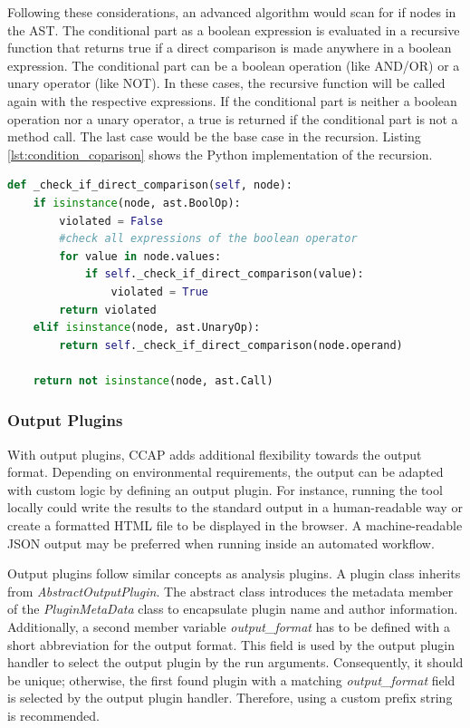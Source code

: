 Following these considerations, an advanced algorithm would scan for if nodes in the AST. The conditional part as a boolean expression is evaluated in a recursive function that returns true if a direct comparison is made anywhere in a boolean expression.
The conditional part can be a boolean operation (like AND/OR) or a unary operator (like NOT).  In these cases, the recursive function will be called again with the respective expressions. If the conditional part is neither a boolean operation nor a unary operator, a true is returned if the conditional part is not a method call. The last case would be the base case in the recursion. Listing \ref{lst:condition_coparison} shows the Python implementation of the recursion.
\begin{lstlisting}[language=Python, label=lst:condition_coparison, caption={Recursive function to analyse an if statement for direct comparisons. Since a condition should contain a method call, the function returns False if this is not the case.}]
def _check_if_direct_comparison(self, node):
    if isinstance(node, ast.BoolOp):
        violated = False
        #check all expressions of the boolean operator
        for value in node.values:
            if self._check_if_direct_comparison(value):
                violated = True
        return violated
    elif isinstance(node, ast.UnaryOp):
        return self._check_if_direct_comparison(node.operand)

    return not isinstance(node, ast.Call)\end{lstlisting}

\subsubsection{Output Plugins}
With output plugins, CCAP adds additional flexibility towards the output format. Depending on environmental requirements, the output can be adapted with custom logic by defining an output plugin. For instance, running the tool locally could write the results to the standard output in a human-readable way or create a formatted HTML file to be displayed in the browser. A machine-readable JSON output may be preferred when running inside an automated workflow.

Output plugins follow similar concepts as analysis plugins. A plugin class inherits from \textit{AbstractOutputPlugin}. The abstract class introduces the metadata member of the \textit{PluginMetaData} class to encapsulate plugin name and author information. Additionally, a second member variable \textit{output\_format} has to be defined with a short abbreviation for the output format. This field is used by the output plugin handler to select the output plugin by the run arguments. Consequently, it should be unique; otherwise, the first found plugin with a matching \textit{output\_format} field is selected by the output plugin handler. Therefore, using a custom prefix string is recommended.

